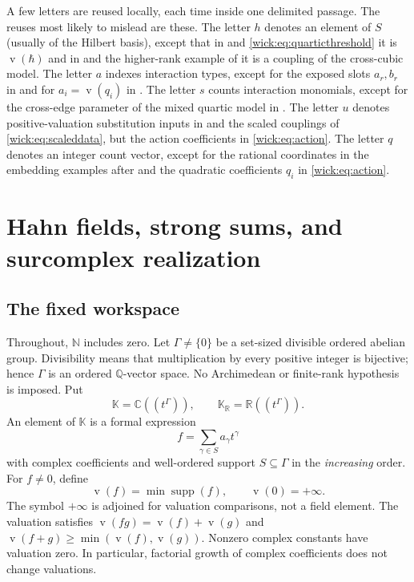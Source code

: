 \documentclass[11pt,letterpaper]{article}
\numberwithin{equation}{section}
\theoremstyle{definition}
\theoremstyle{remark}
\newcommand{\R}{\mathbb R}
\newcommand{\C}{\mathbb C}
\newcommand{\Q}{\mathbb Q}
\newcommand{\N}{\mathbb N}
\newcommand{\K}{\mathbb K}
\newcommand{\KR}{\mathbb K_{\R}}
\newcommand{\supp}{\operatorname{supp}}
\newcommand{\val}{\operatorname v}
\begin{document}
A few letters are reused locally, each time inside one delimited passage.
The reuses most likely to mislead are these. The letter $h$ denotes an element of $S$ (usually of the Hilbert
basis), except that in  and
\eqref{wick:eq:quarticthreshold} it is $\val(\hbar)$ and in
 and the higher-rank example of
 it is a coupling of the cross-cubic model. The
letter $a$ indexes interaction types, except for the exposed slots $a_r,b_r$
in  and for $a_i=\val(q_i)$ in
. The letter $s$ counts interaction monomials,
except for the cross-edge parameter of the mixed quartic model in
. The letter $u$ denotes positive-valuation substitution
inputs in  and the scaled couplings of
\eqref{wick:eq:scaleddata}, but the action coefficients in
\eqref{wick:eq:action}. The letter $q$ denotes an integer count vector,
except for the rational coordinates in the embedding examples after
 and the quadratic coefficients $q_i$ in
\eqref{wick:eq:action}.

\section{Hahn fields, strong sums, and surcomplex realization}
\label{wick:sec:hahn}

\subsection{The fixed workspace}

Throughout, $\N$ includes zero. Let $\Gamma\ne\{0\}$ be a set-sized divisible
ordered abelian group. Divisibility means that multiplication by every
positive integer is bijective; hence $\Gamma$ is an ordered $\Q$-vector space.
No Archimedean or finite-rank hypothesis is imposed. Put
\[
 \K=\C((t^\Gamma)),\qquad \KR=\R((t^\Gamma)).
\]
An element of $\K$ is a formal expression
\[
 f=\sum_{\gamma\in S}a_\gamma t^\gamma
\]
with complex coefficients and well-ordered support $S\subseteq\Gamma$ in the
\emph{increasing} order. For $f\ne0$, define
\[
 \val(f)=\min\supp(f),\qquad \val(0)=+\infty.
\]
The symbol $+\infty$ is adjoined for valuation comparisons, not a field element.
The valuation satisfies $\val(fg)=\val(f)+\val(g)$ and
$\val(f+g)\ge\min(\val(f),\val(g))$. Nonzero complex constants have valuation
zero. In particular, factorial growth of complex coefficients does not
change valuations.
\end{document}
